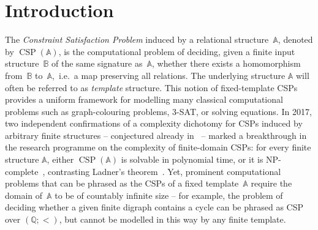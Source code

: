 \documentclass[a4paper,reqno, cleveref]{amsart}
\newcommand{\Q}{\mathbb{Q}}
\DeclareMathOperator{\CSP}{CSP}
\newcommand{\sA}{\mathbb A}
\newcommand{\sB}{\mathbb B}
\begin{document}
\section{Introduction}  
The \emph{Constraint Satisfaction Problem} induced by a relational
structure~$\sA$, denoted by $\CSP(\sA)$, is the computational problem of 
deciding, given a finite input structure~$\sB$ of the same signature as~$\sA$,
whether there exists a homomorphism from~$\sB$ to~$\sA$,~i.e.~a map preserving 
all relations. The underlying structure $\sA$ will often be referred to as \emph{template} structure. 
This notion of fixed-template CSPs provides a uniform framework for modelling
many classical computational problems such as graph-colouring problems, $3$-SAT, or solving %
equations. In 2017, two independent confirmations of a
complexity dichotomy for CSPs induced by arbitrary finite structures -- conjectured already in~\cite{FederVardiSTOC,FederVardi} -- marked a
breakthrough in the research programme on the complexity of finite-domain CSPs: for every finite structure $\sA$, either $\CSP(\sA)$ is solvable in polynomial time, or it is NP-complete~\cite{BulatovFVConjecture,ZhukFVConjecture,Zhuk20}, contrasting Ladner's theorem~\cite{Ladner}. 
%
Yet, prominent computational problems that can be phrased as the CSPs of a fixed template~$\sA$ require the domain of~$\sA$ to be of countably infinite size -- for example, the problem of deciding whether a given finite digraph contains a cycle can be phrased as CSP over $(\Q; <)$, but cannot be modelled in this way by any finite template. 
\end{document}
